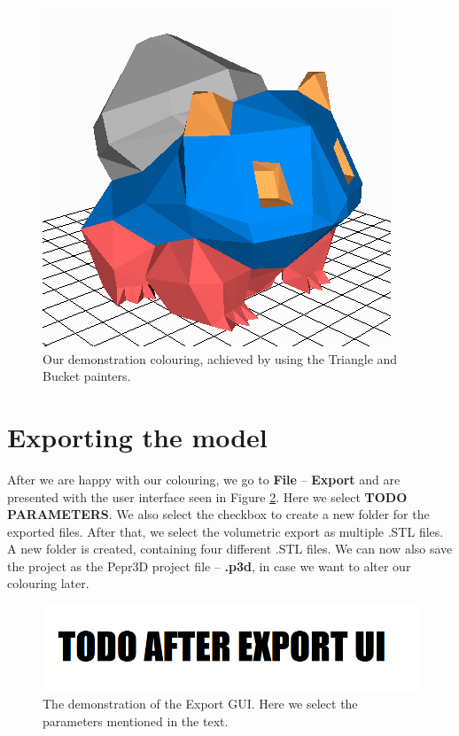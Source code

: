 \begin{figure}
	\centering
	\includegraphics[scale=1]{images/result.png}
	\caption{Our demonstration colouring, achieved by using the Triangle and Bucket painters.}
	\label{fig:painted}
\end{figure}

\section{Exporting the model}

After we are happy with our colouring, we go to \textbf{File} -- \textbf{Export} and are presented with the user interface seen in Figure \ref{fig:exportui}. Here we select \textbf{TODO PARAMETERS}. We also select the checkbox to create a new folder for the exported files. After that, we select the volumetric export as multiple .STL files. A new folder is created, containing four different .STL files. We can now also save the project as the Pepr3D project file -- \textbf{.p3d}, in case we want to alter our colouring later.

\begin{figure}
	\centering
	\includegraphics[scale=0.7]{images/export_ui.png}
	\caption{The demonstration of the Export GUI. Here we select the parameters mentioned in the text.}
	\label{fig:exportui}
\end{figure}

